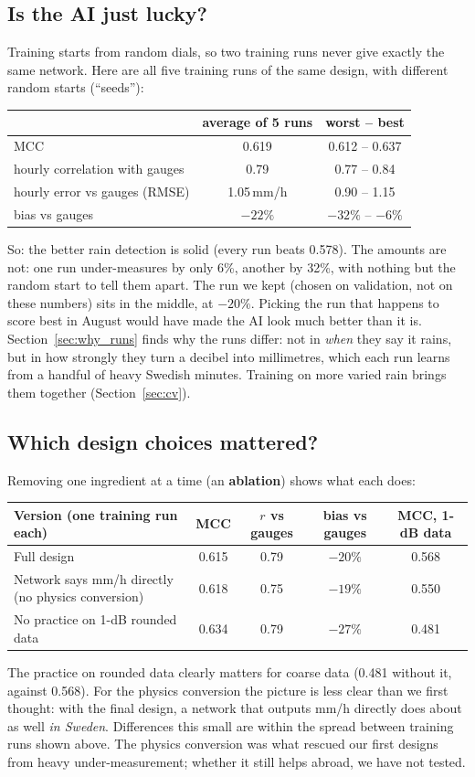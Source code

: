 \subsection{Is the AI just lucky?}
Training starts from random dials, so two training runs never give exactly the same network. Here are all five training
runs of the same design, with different random starts (``seeds''):
\begin{center}\small
\begin{tabular}{lcc}
\toprule
& average of 5 runs & worst -- best \\
\midrule
MCC & 0.619 & 0.612 -- 0.637 \\
hourly correlation with gauges & 0.79 & 0.77 -- 0.84 \\
hourly error vs gauges (RMSE) & 1.05\,mm/h & 0.90 -- 1.15 \\
bias vs gauges & $-22\%$ & $-32\%$ -- $-6\%$ \\
\bottomrule
\end{tabular}
\end{center}
So: the better rain detection is solid (every run beats 0.578). The amounts are not: one run under-measures by only
6\%, another by 32\%, with nothing but the random start to tell them apart. The run we kept (chosen on validation, not on
these numbers) sits in the middle, at $-20\%$. Picking the run that happens to score best in August would have made the
AI look much better than it is. Section~\ref{sec:why_runs} finds why the runs differ: not in \emph{when} they say it rains,
but in how strongly they turn a decibel into millimetres, which each run learns from a handful of heavy Swedish minutes.
Training on more varied rain brings them together (Section~\ref{sec:cv}).

\subsection{Which design choices mattered?}
Removing one ingredient at a time (an \textbf{ablation}) shows what each does:
\begin{center}\footnotesize
\begin{tabular}{p{6.3cm}cccc}
\toprule
Version (one training run each) & MCC & $r$ vs gauges & bias vs gauges & MCC, 1-dB data\\
\midrule
Full design & 0.615 & 0.79 & $-20\%$ & 0.568\\
Network says mm/h directly (no physics conversion) & 0.618 & 0.75 & $-19\%$ & 0.550\\
No practice on 1-dB rounded data & 0.634 & 0.79 & $-27\%$ & 0.481\\
\bottomrule
\end{tabular}
\end{center}
The practice on rounded data clearly matters for coarse data (0.481 without it, against 0.568). For the physics
conversion the picture is less clear than we first thought: with the final design, a network that outputs mm/h
directly does about as well \emph{in Sweden}. Differences this small are within the spread between training runs shown
above. The physics conversion was what rescued our first designs from heavy under-measurement; whether it still helps
abroad, we have not tested.

